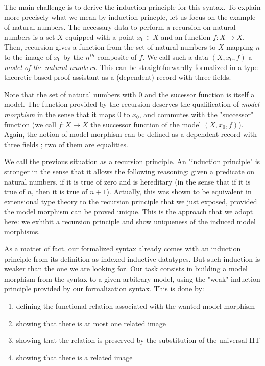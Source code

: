 The main challenge is to derive the induction principle for this syntax. 
To explain more precisely what we mean by induction princple, let us focus on the example of natural numbers. The necessary data to perform a recursion on natural numbers is a set $X$ equipped with a point $x_0 \in X$ and an function $f: X \to X$. Then, recursion gives a function from the set of natural numbers to $X$ mapping $n$ to the image of $x_0$ by the $n^{th}$ composite of $f$. We call such a data $(X,x_0,f)$ a \emph{model of the natural numbers}.
This can be straightforwardly formalized in a type-theoretic based proof assistant as a (dependent) record with three fields.

Note that the set of natural numbers with $0$ and the sucessor function is itself a model. The function provided
by the recursion deserves the qualification of \emph{model morphism} in the sense that it maps $0$ to $x_0$, and commutes with the "successor" function (we call $f:X\to X$ the successor function of the model $(X,x_0,f)$).
Again, the notion of model morphism can be defined as a dependent record with three fields ; two of them are equalities.

We call the previous situation as a recursion principle.
 An "induction principle" is stronger in the sense that it allows the following reasoning: given a predicate on natural numbers, if it is true of zero and is hereditary (in the sense that if it is true of $n$, then it is true of $n+1$). Actually, this was shown to be equivalent in extensional type theory to the recursion principle that we just exposed, provided the model morphism can be proved unique. This is the approach that we adopt here: we exhibit a recursion principle and show uniqueness of the induced model morphisms.


As a matter of fact, our formalized syntax already comes with an induction principle from its definition as indexed inductive datatypes. But such induction is weaker than the one we are looking for.
 Our task consists in building a model morphism from the syntax to a given arbitrary model, using the "weak" induction principle provided by our formalization syntax.
This is done by:
\begin{enumerate}
\item
  defining the functional relation associated with the wanted model morphism
\item
showing that there is at most one related image
\item
  showing that the relation is preserved by the substitution of the universal IIT
\item
showing that there is a related image
\end{enumerate}


